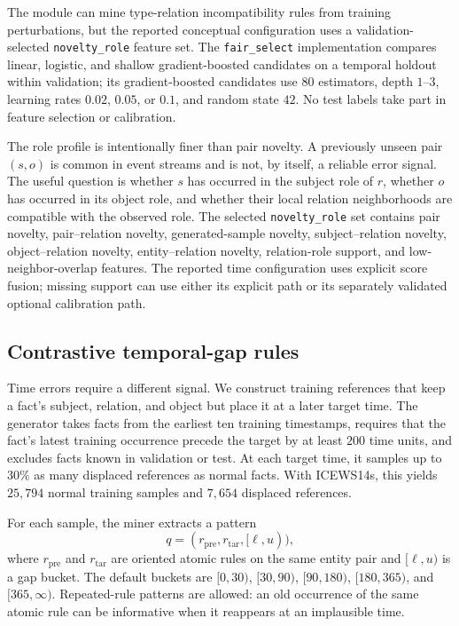 The module can mine type-relation incompatibility rules from training perturbations, but the reported conceptual configuration uses a validation-selected \texttt{novelty\_role} feature set. The \texttt{fair\_select} implementation compares linear, logistic, and shallow gradient-boosted candidates on a temporal holdout within validation; its gradient-boosted candidates use $80$ estimators, depth $1$--$3$, learning rates $0.02$, $0.05$, or $0.1$, and random state $42$. No test labels take part in feature selection or calibration.

The role profile is intentionally finer than pair novelty. A previously unseen pair $(s,o)$ is common in event streams and is not, by itself, a reliable error signal. The useful question is whether $s$ has occurred in the subject role of $r$, whether $o$ has occurred in its object role, and whether their local relation neighborhoods are compatible with the observed role. The selected \texttt{novelty\_role} set contains pair novelty, pair--relation novelty, generated-sample novelty, subject--relation novelty, object--relation novelty, entity--relation novelty, relation-role support, and low-neighbor-overlap features. The reported time configuration uses explicit score fusion; missing support can use either its explicit path or its separately validated optional calibration path.

\subsection{Contrastive temporal-gap rules}

Time errors require a different signal. We construct training references that keep a fact's subject, relation, and object but place it at a later target time. The generator takes facts from the earliest ten training timestamps, requires that the fact's latest training occurrence precede the target by at least $200$ time units, and excludes facts known in validation or test. At each target time, it samples up to $30\%$ as many displaced references as normal facts. With ICEWS14s, this yields $25{,}794$ normal training samples and $7{,}654$ displaced references.

For each sample, the miner extracts a pattern
\begin{equation}
q=(r_{\mathrm{pre}},r_{\mathrm{tar}},[\ell,u)),
\end{equation}
where $r_{\mathrm{pre}}$ and $r_{\mathrm{tar}}$ are oriented atomic rules on the same entity pair and $[\ell,u)$ is a gap bucket. The default buckets are $[0,30)$, $[30,90)$, $[90,180)$, $[180,365)$, and $[365,\infty)$. Repeated-rule patterns are allowed: an old occurrence of the same atomic rule can be informative when it reappears at an implausible time.

